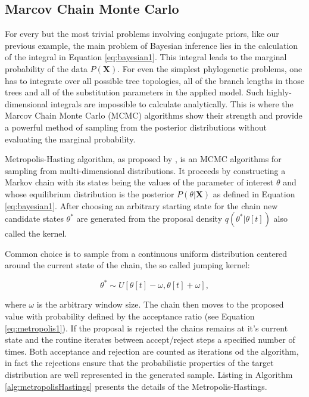\documentclass[12pt,twoside]{mitthesis}
\theoremstyle{plain}
\theoremstyle{definition}
\theoremstyle{remark}
\begin{document}
\subsection{Marcov Chain Monte Carlo}

For every but the most trivial problems involving conjugate priors, like our previous example, the main problem of Bayesian inference lies in the calculation of the integral in Equation \ref{eq:bayesian1}.
This integral leads to the marginal probability of the data $P\left(\mathbf{X}\right)$. 
For even the simplest phylogenetic problems, one has to integrate over all possible tree topologies, all of the branch lengths in those trees and all of the substitution parameters in the applied model.
Such highly-dimensional integrals are impossible to calculate analytically.
This is where the Marcov Chain Monte Carlo (MCMC) algorithms show their strength and provide a powerful method of sampling from the posterior distributions without evaluating the marginal probability.

Metropolis-Hasting 
algorithm, as proposed by \citet{Metropolis1953}, is an MCMC algorithms for sampling from multi-dimensional distributions.
It proceeds by constructing a Markov chain with its states being the values of the parameter of interest $\theta$ and whose equilibrium distribution is the posterior $P\left(\theta|\mathbf{X}\right)$ as defined in Equation \ref{eq:bayesian1}.
After choosing an arbitrary starting state for the chain new candidate states $\theta^{*}$ are generated from the proposal density $q(\theta^{*} | \theta[t])$ also called the kernel.

Common choice is to sample from a continuous uniform distribution centered around the current state of the chain, the so called jumping kernel: 

$$\theta^{*}\sim U\left[\theta[t]-\omega,\theta[t]+\omega\right],$$

\noindent
where $\omega$ is the arbitrary window size.
The chain then moves to the proposed value with probability defined by the acceptance ratio (see Equation \ref{eq:metropolis1}).
If the proposal is rejected the chains remains at it's current state and the routine iterates between accept/reject steps a specified number of times.
Both acceptance and rejection are counted as iterations od the algorithm, in fact the rejections ensure that the probabilistic properties of the target distribution are well represented in the generated sample.  
Listing in Algorithm \ref{alg:metropolisHastings} presents the details of the Metropolis-Hastings.
\end{document}
